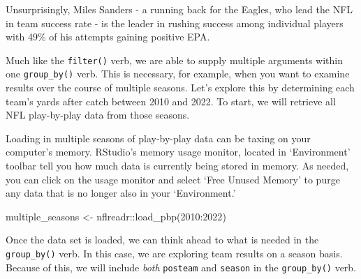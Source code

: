 \documentclass[
  letterpaper,
]{krantz}
\newenvironment{Shaded}{\begin{snugshade}}{\end{snugshade}}
\newcommand{\DecValTok}[1]{\textcolor[rgb]{0.68,0.00,0.00}{#1}}
\newcommand{\FunctionTok}[1]{\textcolor[rgb]{0.28,0.35,0.67}{#1}}
\newcommand{\NormalTok}[1]{\textcolor[rgb]{0.00,0.23,0.31}{#1}}
\newcommand{\OtherTok}[1]{\textcolor[rgb]{0.00,0.23,0.31}{#1}}
\newcommand{\SpecialCharTok}[1]{\textcolor[rgb]{0.37,0.37,0.37}{#1}}
\begin{document}
Unsurprisingly, Miles Sanders - a running back for the Eagles, who lead
the NFL in team success rate - is the leader in rushing success among
individual players with 49\% of his attempts gaining positive EPA.

Much like the \texttt{filter()} verb, we are able to supply multiple
arguments within one \texttt{group\_by()} verb. This is necessary, for
example, when you want to examine results over the course of multiple
seasons. Let's explore this by determining each team's yards after catch
between 2010 and 2022. To start, we will retrieve all NFL play-by-play
data from those seasons.

\begin{tcolorbox}[enhanced jigsaw, left=2mm, toprule=.15mm, opacitybacktitle=0.6, leftrule=.75mm, bottomrule=.15mm, colbacktitle=quarto-callout-caution-color!10!white, breakable, colback=white, bottomtitle=1mm, toptitle=1mm, title=\textcolor{quarto-callout-caution-color}{\faFire}\hspace{0.5em}{Caution}, coltitle=black, titlerule=0mm, arc=.35mm, opacityback=0, colframe=quarto-callout-caution-color-frame, rightrule=.15mm]

Loading in multiple seasons of play-by-play data can be taxing on your
computer's memory. RStudio's memory usage monitor, located in
`Environment' toolbar tell you how much data is currently being stored
in memory. As needed, you can click on the usage monitor and select
`Free Unused Memory' to purge any data that is no longer also in your
`Environment.'

\end{tcolorbox}

\begin{Shaded}
\begin{Highlighting}[]
\NormalTok{multiple\_seasons }\OtherTok{\textless{}{-}}\NormalTok{ nflreadr}\SpecialCharTok{::}\FunctionTok{load\_pbp}\NormalTok{(}\DecValTok{2010}\SpecialCharTok{:}\DecValTok{2022}\NormalTok{)}
\end{Highlighting}
\end{Shaded}

Once the data set is loaded, we can think ahead to what is needed in the
\texttt{group\_by()} verb. In this case, we are exploring team results
on a season basis. Because of this, we will include \emph{both}
\texttt{posteam} and \texttt{season} in the \texttt{group\_by()} verb.
\end{document}
